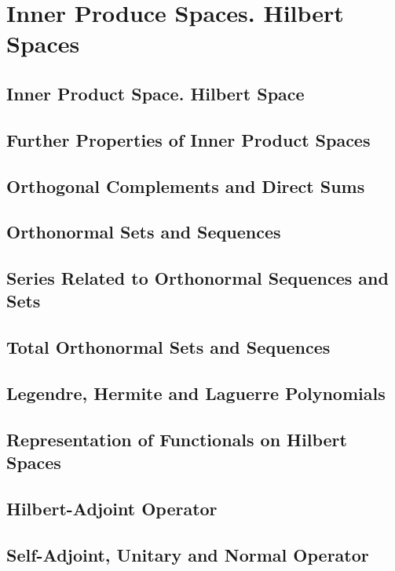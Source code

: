 \chapter{Inner Produce Spaces. Hilbert Spaces}

\section{Inner Product Space. Hilbert Space}

\section{Further Properties of Inner Product Spaces}

\section{Orthogonal Complements and Direct Sums}

\section{Orthonormal Sets and Sequences}

\section{Series Related to Orthonormal Sequences and Sets}

\section{Total Orthonormal Sets and Sequences}

\section{Legendre, Hermite and Laguerre Polynomials}

\section{Representation of Functionals on Hilbert Spaces}

\section{Hilbert-Adjoint Operator}

\section{Self-Adjoint, Unitary and Normal Operator}
